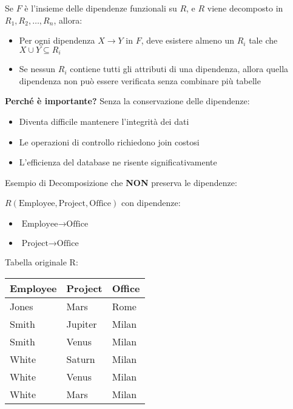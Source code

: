 \documentclass{article}
\begin{document}
	Se $F$ è l'insieme delle dipendenze funzionali su $R$, e $R$ viene decomposto in $R_1, R_2, \ldots, R_n$, allora:
	\begin{itemize}
		\item Per ogni dipendenza $X \rightarrow Y$ in $F$, deve esistere almeno un $R_i$ tale che $X \cup Y \subseteq R_i$
		\item Se nessun $R_i$ contiene tutti gli attributi di una dipendenza, allora quella dipendenza non può essere verificata senza combinare più tabelle
	\end{itemize}
	
	\textbf{Perché è importante?} Senza la conservazione delle dipendenze:
	\begin{itemize}
		\item Diventa difficile mantenere l'integrità dei dati
		\item Le operazioni di controllo richiedono join costosi
		\item L'efficienza del database ne risente significativamente
	\end{itemize}
	
	\noindent Esempio di Decomposizione che \textbf{NON} preserva le dipendenze:

	$R(\text{Employee}, \text{Project}, \text{Office})$ con dipendenze:

	\begin{itemize}
		\item $\text{Employee} \rightarrow \text{Office}$
		\item $\text{Project} \rightarrow \text{Office}$
	\end{itemize}

	\noindent Tabella originale R:
	\begin{center}
	\begin{tabular}{|l|l|l|}
		\hline
		\textbf{Employee} & \textbf{Project} & \textbf{Office} \\ \hline
		Jones & Mars & Rome \\ \hline
		Smith & Jupiter & Milan \\ \hline
		Smith & Venus & Milan \\ \hline
		White & Saturn & Milan \\ \hline
		White & Venus & Milan \\ \hline
		White & Mars & Milan \\ \hline
	\end{tabular}
	\end{center}
\end{document}
